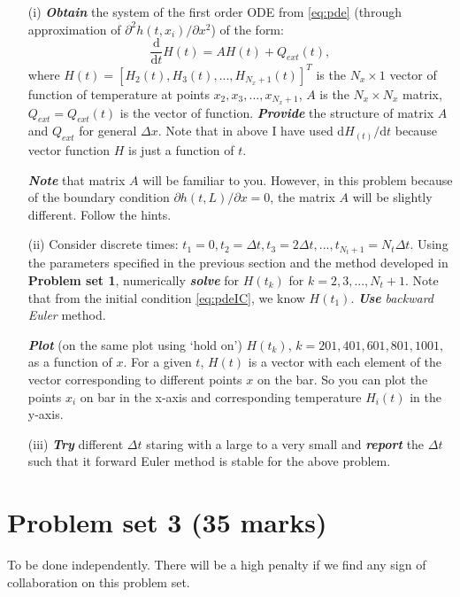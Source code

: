 \documentclass[11pt,a4paper]{article}
\newcommand{\dd}{\mathrm{d}}
\newcommand{\p}{\partial }
\newcommand{\bfit}[1]{\textit{\textbf{#1}}}
\begin{document}
\begin{itemize}
\item[(i)] \bfit{Obtain} the system of the first order ODE from \eqref{eq:pde} (through approximation of $\p^2 h(t, x_i)/ \p x^2$) of the form:
\begin{equation}\label{eq:pdeDisc}
\frac{\dd}{\dd t} H(t) = A H(t) + Q_{ext} (t),
\end{equation}
where $H(t) = [H_2(t), H_3(t), ..., H_{N_x + 1}(t)]^T$ is the $N_x \times 1$ vector of function of temperature at points $x_2, x_3, ..., x_{N_x + 1}$, $A$ is the $N_x \times N_x$ matrix, $Q_{ext} = Q_{ext}(t)$ is the vector of function. \bfit{Provide} the structure of matrix $A$ and $Q_{ext}$ for general $\Delta x$.  Note that in above I have used $\dd H_(t) / \dd t$ because vector function $H$ is just a function of $t$.

\bfit{Note} that matrix $A$ will be familiar to you. However, in this problem because of the boundary condition $\p h(t, L) / \p x = 0$, the matrix $A$ will be slightly different. Follow the hints.  

\item[(ii)] Consider discrete times: $t_1 = 0, t_2 = \Delta t, t_3 = 2\Delta t, ..., t_{N_t + 1} = N_t \Delta t$. Using the parameters specified in the previous section and the method developed in {\bf Problem set 1}, numerically \bfit{solve} for $H(t_k)$ for $k=2, 3, ..., N_t + 1$. Note that from the initial condition \eqref{eq:pdeIC}, we know $H(t_1)$. \bfit{Use} {\it backward Euler} method. 

\bfit{Plot} (on the same plot using `hold on') $H(t_k)$, $k=201, 401, 601, 801, 1001$, as a function of $x$. For a given $t$, $H(t)$ is a vector with each element of the vector corresponding to different points $x$ on the bar. So you can plot the points $x_i$ on bar in the x-axis and corresponding temperature $H_i(t)$ in the y-axis.

\item[(iii)] \bfit{Try} different $\Delta t$ staring with a large to a very small and \bfit{report} the $\Delta t$ such that {it forward Euler} method is stable for the above problem.
\end{itemize}
 
\section{Problem set 3 (35 marks)}
{\color{red} To be done independently. There will be a high penalty if we find any sign of collaboration on this problem set.}
\end{document}
